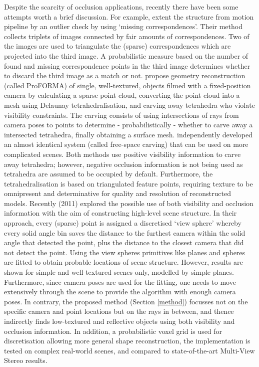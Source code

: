 Despite the scarcity of occlusion applications, recently there have been some attempts worth a brief discussion. For example, \ZachOld extent the structure from motion pipeline by an outlier check by using `missing correspondences'. Their method collects triplets of images connected by fair amounts of correspondences. Two of the images are used to triangulate the (sparse) correspondences which are projected into the third image. A probabilistic measure based on the number of found and missing correspondence points in the third image determines whether to discard the third image as a match or not.  propose geometry reconstruction (called ProFORMA) of single, well-textured, objects filmed with a fixed-position camera by calculating a sparse point cloud, converting the point cloud into a mesh using Delaunay tetrahedralisation, and carving away tetrahedra who violate visibility constraints. The carving consists of using intersections of rays from camera poses to points to determine - probabilistically - whether to carve away a intersected tetrahedra, finally obtaining a surface mesh.  independently developed an almost identical system (called free-space carving) that can be used on more complicated scenes. Both methods use positive visibility information to carve away tetrahedra; however, negative occlusion information is not being used as tetrahedra are assumed to be occupied by default. Furthermore, the tetrahedralisation is based on triangulated feature points, requiring texture to be omnipresent and determinative for quality and resolution of reconstructed models.
Recently  (2011) explored the possible use of both visibility and occlusion information with the aim of constructing high-level scene structure. In their approach, every (sparse) point is assigned a discretised `view sphere' whereby every solid angle bin saves the distance to the furthest camera within the solid angle that detected the point, plus the distance to the closest camera that did not detect the point. Using the view spheres primitives like planes and spheres are fitted to obtain probable locations of scene structure. However, results are shown for simple and well-textured scenes only, modelled by simple planes. Furthermore, since camera poses are used for the fitting, one needs to move extensively through the scene to provide the algorithm with enough camera poses. In contrary, the proposed method (Section \ref{method}) focusses not on the specific camera and point locations but on the rays in between, and thence indirectly finds low-textured and reflective objects using both visibility and occlusion information. In addition, a probabilistic voxel grid is used for discretisation allowing more general shape reconstruction, the implementation is tested on complex real-world scenes, and compared to state-of-the-art Multi-View Stereo results.

